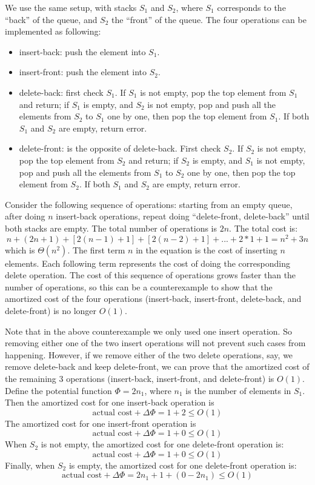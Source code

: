 \documentclass[11pt]{article}
\begin{document}
We use the same setup, with stacks $S_1$ and $S_2$, where $S_1$ corresponds to
the ``back'' of the queue, and $S_2$ the ``front'' of the queue.
The four operations can be implemented as following:
\begin{itemize}
  \itemsep 0pt
  \item
    insert-back: push the element into $S_1$.
  \item
    insert-front: push the element into $S_2$.
  \item
    delete-back: first check $S_1$. If $S_1$ is not empty, pop the top element
    from $S_1$ and return; if $S_1$ is empty, and $S_2$ is not empty, pop and
    push all the elements from $S_2$ to $S_1$ one by one, then pop the top
    element from $S_1$. If both $S_1$ and $S_2$ are empty, return error.
  \item
    delete-front: is the opposite of delete-back. First check $S_2$. If $S_2$
    is not empty, pop the top element from $S_2$ and return; if $S_2$ is empty,
    and $S_1$ is not empty, pop and push all the elements from $S_1$ to $S_2$
    one by one, then pop the top element from $S_2$. If both $S_1$ and $S_2$
    are empty, return error.
\end{itemize}
Consider the following sequence of operations: starting from an empty queue,
after doing $n$ insert-back operations, repeat doing ``delete-front,
delete-back'' until both stacks are empty. The total number of operations is
$2n$. The total cost is:
  $$n + (2n+1)+[2(n-1)+1]+[2(n-2)+1]+...+2*1+1 = n^2+3n$$
which is $\Theta(n^2)$. The first term $n$ in the equation is the cost of
inserting $n$ elements. Each following term represents the cost of doing the
corresponding delete operation. The cost of this sequence of operations grows
faster than the number of operations, so this can be a counterexample to show
that the amortized cost of the four operations (insert-back, insert-front,
delete-back, and delete-front) is no longer $O(1)$.

Note that in the above counterexample we only used one insert operation. So
removing either one of the two insert operations will not prevent such cases
from happening. However, if we remove either of the two delete operations,
say, we remove delete-back and keep delete-front, we can prove that the
amortized cost of the remaining 3 operations (insert-back, insert-front,
and delete-front) is $O(1)$.  Define the potential function $\Phi=2n_1$,
where $n_1$ is the number of elements in $S_1$. Then the
amortized cost for one insert-back operation is
  $$\text{actual cost} + \Delta\Phi = 1+2 \leqslant O(1)$$
The amortized cost for one insert-front operation is
  $$\text{actual cost} + \Delta\Phi = 1+0 \leqslant O(1)$$
When $S_2$ is not empty, the amortized cost for one delete-front operation is:
  $$\text{actual cost} + \Delta\Phi = 1+0 \leqslant O(1)$$
Finally, when $S_2$ is empty, the amortized cost for one delete-front
operation is:
  $$\text{actual cost} + \Delta\Phi = 2n_1+1+(0-2n_1) \leqslant O(1)$$
\end{document}
